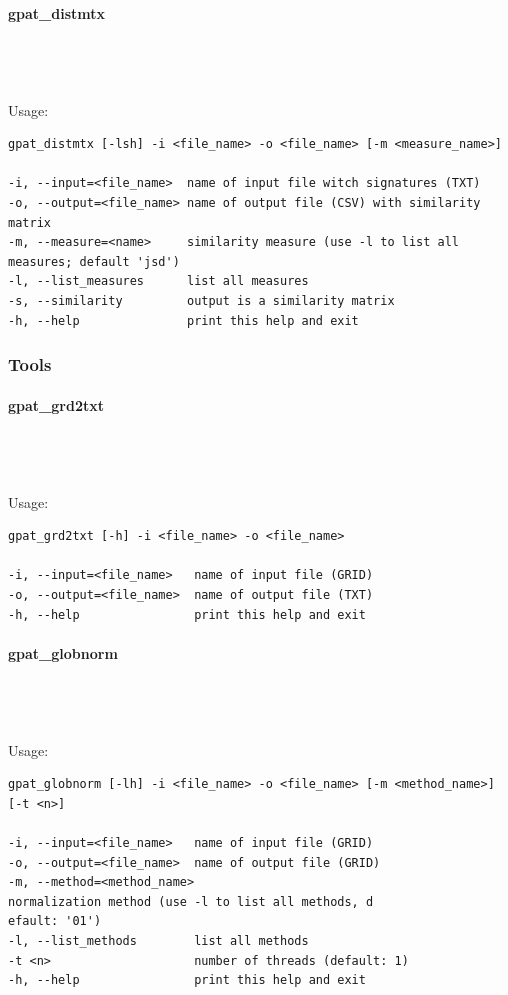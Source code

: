 \documentclass[12pt,margin=0.5in]{article}
\newcommand{\newparagraph}[1]{\paragraph{#1}\mbox{}\\}
\begin{document}
\newparagraph{gpat\_distmtx}
{}
\\\\
Usage:

\begin{minipage}{\linewidth}
\begin{lstlisting}
gpat_distmtx [-lsh] -i <file_name> -o <file_name> [-m <measure_name>]

-i, --input=<file_name>  name of input file witch signatures (TXT)
-o, --output=<file_name> name of output file (CSV) with similarity matrix
-m, --measure=<name>     similarity measure (use -l to list all measures; default 'jsd')
-l, --list_measures      list all measures
-s, --similarity         output is a similarity matrix
-h, --help               print this help and exit
\end{lstlisting}
\end{minipage}

\subsubsection{Tools}
\newparagraph{gpat\_grd2txt}
{}
\\\\
Usage:

\begin{minipage}{\linewidth}
\begin{lstlisting}
gpat_grd2txt [-h] -i <file_name> -o <file_name>

-i, --input=<file_name>   name of input file (GRID)
-o, --output=<file_name>  name of output file (TXT)
-h, --help                print this help and exit
\end{lstlisting}
\end{minipage}

\newparagraph{gpat\_globnorm}
{}
\\\\
Usage:

\begin{minipage}{\linewidth}
\begin{lstlisting}
gpat_globnorm [-lh] -i <file_name> -o <file_name> [-m <method_name>] [-t <n>]

-i, --input=<file_name>   name of input file (GRID)
-o, --output=<file_name>  name of output file (GRID)
-m, --method=<method_name> 
normalization method (use -l to list all methods, d
efault: '01')
-l, --list_methods        list all methods
-t <n>                    number of threads (default: 1)
-h, --help                print this help and exit
\end{lstlisting}
\end{minipage}
\end{document}
